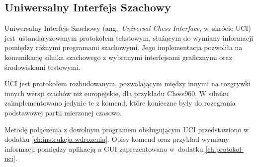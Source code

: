 \subsection{Uniwersalny Interfejs Szachowy}
\label{subsec:interfejs-szachowy}

Uniwersalny Interfejs Szachowy (ang.~\emph{Universal Chess Interface}, w~skrócie UCI) \cite*{UCIdoc} jest~ustandaryzowanym protokołem tekstowym, służącym do wymiany informacji pomiędzy różnymi programami szachowymi.
Jego implementacja pozwoliła na komunikację silnika szachowego z wybranymi interfejsami graficznymi oraz środowiskami testowymi.

UCI jest protokołem rozbudowanym, pozwalającym między innymi na rozgrywki innych wersji szachów niż europejskie, dla przykładu Chess960.
W silniku zaimplementowano jedynie te z komend, które konieczne były do rozegrania podstawowej partii mierzonej czasowo.


Metodę połączenia z dowolnym programem obsługującym UCI przedstawiono w dodatku \ref{ch:instrukcja-wdrozenia}.
Opisy komend oraz przykład wymiany informacji pomiędzy aplikacją a GUI zaprezentowano w~dodatku \ref{ch:protokol-uci}.